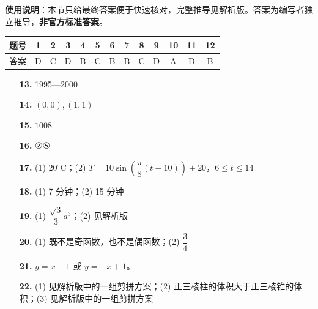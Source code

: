 
\begin{gknotice}
\textbf{使用说明}：本节只给最终答案便于快速核对，完整推导见解析版。答案为编写者独立推导，\textbf{非官方标准答案}。
\end{gknotice}

\begin{center}\begin{tabular}{ccccccccccccc}
\toprule
题号 & 1 & 2 & 3 & 4 & 5 & 6 & 7 & 8 & 9 & 10 & 11 & 12 \\
\midrule
答案 & D & C & D & B & C & B & B & C & D & A & D & B \\
\bottomrule
\end{tabular}\end{center}

\begin{itemize}[leftmargin=2.6em]
  \item[\textbf{13.}] 1995—2000
  \item[\textbf{14.}] $(0,0),(1,1)$
  \item[\textbf{15.}] $1008$
  \item[\textbf{16.}] ②⑤
\end{itemize}

\begin{itemize}[leftmargin=2.6em]
  \item[\textbf{17.}] (1) $20^\circ\mathrm C$；(2) $T=10\sin\left(\dfrac\pi8(t-10)\right)+20$，$6\leqslant t\leqslant14$
  \item[\textbf{18.}] (1) 7 分钟；(2) 15 分钟
  \item[\textbf{19.}] (1) $\dfrac{\sqrt3}{3}a^3$；(2) 见解析版
  \item[\textbf{20.}] (1) 既不是奇函数，也不是偶函数；(2) $\dfrac34$
  \item[\textbf{21.}] $y=x-1$ 或 $y=-x+1$。
  \item[\textbf{22.}] (1) 见解析版中的一组剪拼方案；(2) 正三棱柱的体积大于正三棱锥的体积；(3) 见解析版中的一组剪拼方案
\end{itemize}
